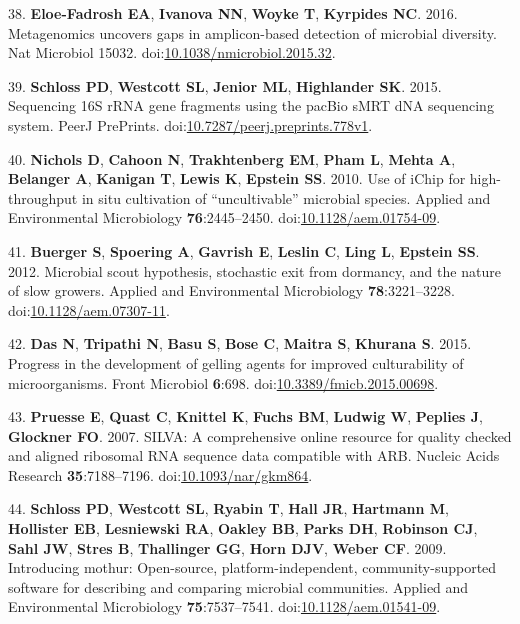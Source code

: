 \documentclass[11pt,]{article}
\begin{document}
\hypertarget{ref-EloeFadrosh2016}{}
38. \textbf{Eloe-Fadrosh EA}, \textbf{Ivanova NN}, \textbf{Woyke T},
\textbf{Kyrpides NC}. 2016. Metagenomics uncovers gaps in amplicon-based
detection of microbial diversity. Nat Microbiol 15032.
doi:\href{https://doi.org/10.1038/nmicrobiol.2015.32}{10.1038/nmicrobiol.2015.32}.

\hypertarget{ref-Schloss2015}{}
39. \textbf{Schloss PD}, \textbf{Westcott SL}, \textbf{Jenior ML},
\textbf{Highlander SK}. 2015. Sequencing 16S rRNA gene fragments using
the pacBio sMRT dNA sequencing system. PeerJ PrePrints.
doi:\href{https://doi.org/10.7287/peerj.preprints.778v1}{10.7287/peerj.preprints.778v1}.

\hypertarget{ref-Nichols2010}{}
40. \textbf{Nichols D}, \textbf{Cahoon N}, \textbf{Trakhtenberg EM},
\textbf{Pham L}, \textbf{Mehta A}, \textbf{Belanger A}, \textbf{Kanigan
T}, \textbf{Lewis K}, \textbf{Epstein SS}. 2010. Use of iChip for
high-throughput in situ cultivation of ``uncultivable'' microbial
species. Applied and Environmental Microbiology \textbf{76}:2445--2450.
doi:\href{https://doi.org/10.1128/aem.01754-09}{10.1128/aem.01754-09}.

\hypertarget{ref-Buerger2012}{}
41. \textbf{Buerger S}, \textbf{Spoering A}, \textbf{Gavrish E},
\textbf{Leslin C}, \textbf{Ling L}, \textbf{Epstein SS}. 2012. Microbial
scout hypothesis, stochastic exit from dormancy, and the nature of slow
growers. Applied and Environmental Microbiology \textbf{78}:3221--3228.
doi:\href{https://doi.org/10.1128/aem.07307-11}{10.1128/aem.07307-11}.

\hypertarget{ref-Das2015}{}
42. \textbf{Das N}, \textbf{Tripathi N}, \textbf{Basu S}, \textbf{Bose
C}, \textbf{Maitra S}, \textbf{Khurana S}. 2015. Progress in the
development of gelling agents for improved culturability of
microorganisms. Front Microbiol \textbf{6}:698.
doi:\href{https://doi.org/10.3389/fmicb.2015.00698}{10.3389/fmicb.2015.00698}.

\hypertarget{ref-Pruesse2007}{}
43. \textbf{Pruesse E}, \textbf{Quast C}, \textbf{Knittel K},
\textbf{Fuchs BM}, \textbf{Ludwig W}, \textbf{Peplies J},
\textbf{Glockner FO}. 2007. SILVA: A comprehensive online resource for
quality checked and aligned ribosomal RNA sequence data compatible with
ARB. Nucleic Acids Research \textbf{35}:7188--7196.
doi:\href{https://doi.org/10.1093/nar/gkm864}{10.1093/nar/gkm864}.

\hypertarget{ref-Schloss2009}{}
44. \textbf{Schloss PD}, \textbf{Westcott SL}, \textbf{Ryabin T},
\textbf{Hall JR}, \textbf{Hartmann M}, \textbf{Hollister EB},
\textbf{Lesniewski RA}, \textbf{Oakley BB}, \textbf{Parks DH},
\textbf{Robinson CJ}, \textbf{Sahl JW}, \textbf{Stres B},
\textbf{Thallinger GG}, \textbf{Horn DJV}, \textbf{Weber CF}. 2009.
Introducing mothur: Open-source, platform-independent,
community-supported software for describing and comparing microbial
communities. Applied and Environmental Microbiology
\textbf{75}:7537--7541.
doi:\href{https://doi.org/10.1128/aem.01541-09}{10.1128/aem.01541-09}.
\end{document}
